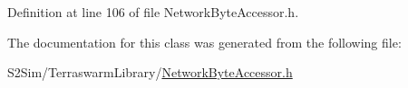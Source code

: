 Definition at line 106 of file Network\-Byte\-Accessor.\-h.



The documentation for this class was generated from the following file\-:\begin{DoxyCompactItemize}
\item 
S2\-Sim/\-Terraswarm\-Library/\hyperlink{_network_byte_accessor_8h}{Network\-Byte\-Accessor.\-h}\end{DoxyCompactItemize}
